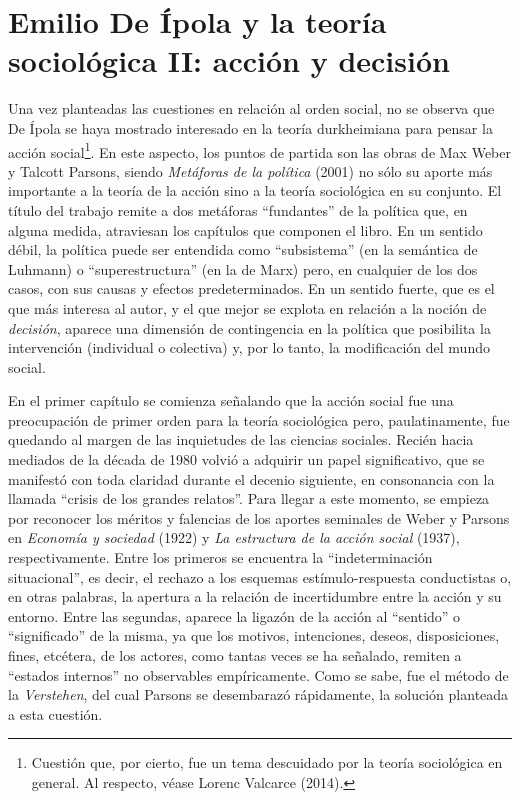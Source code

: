 \section{Emilio De Ípola y la teoría sociológica II: acción y decisión}

Una vez planteadas las cuestiones en relación al orden social, no se observa que De Ípola se haya mostrado interesado en la teoría durkheimiana para pensar la acción social\footnote{Cuestión que, por cierto, fue un tema descuidado por la teoría sociológica en general. Al respecto, véase Lorenc Valcarce (2014).}. En este aspecto, los puntos de partida son las obras de Max Weber y Talcott Parsons, siendo \emph{Metáforas de la política} (2001) no sólo su aporte más importante a la teoría de la acción sino a la teoría sociológica en su conjunto. El título del trabajo remite a dos metáforas ``fundantes'' de la política que, en alguna medida, atraviesan los capítulos que componen el libro. En un sentido débil, la política puede ser entendida como ``subsistema'' (en la semántica de Luhmann) o ``superestructura'' (en la de Marx) pero, en cualquier de los dos casos, con sus causas y efectos predeterminados. En un sentido fuerte, que es el que más interesa al autor, y el que mejor se explota en relación a la noción de \emph{decisión}, aparece una dimensión de contingencia en la política que posibilita la intervención (individual o colectiva) y, por lo tanto, la modificación del mundo social.

En el primer capítulo se comienza señalando que la acción social fue una preocupación de primer orden para la teoría sociológica pero, paulatinamente, fue quedando al margen de las inquietudes de las ciencias sociales. Recién hacia mediados de la década de 1980 volvió a adquirir un papel significativo, que se manifestó con toda claridad durante el decenio siguiente, en consonancia con la llamada ``crisis de los grandes relatos''. Para llegar a este momento, se empieza por reconocer los méritos y falencias de los aportes seminales de Weber y Parsons en \emph{Economía y sociedad} (1922) y \emph{La estructura de la acción social} (1937), respectivamente. Entre los primeros se encuentra la ``indeterminación situacional'', es decir, el rechazo a los esquemas estímulo-respuesta conductistas o, en otras palabras, la apertura a la relación de incertidumbre entre la acción y su entorno. Entre las segundas, aparece la ligazón de la acción al ``sentido'' o ``significado'' de la misma, ya que los motivos, intenciones, deseos, disposiciones, fines, etcétera, de los actores, como tantas veces se ha señalado, remiten a ``estados internos'' no observables empíricamente. Como se sabe, fue el método de la \emph{Verstehen}, del cual Parsons se desembarazó rápidamente, la solución planteada a esta cuestión.

